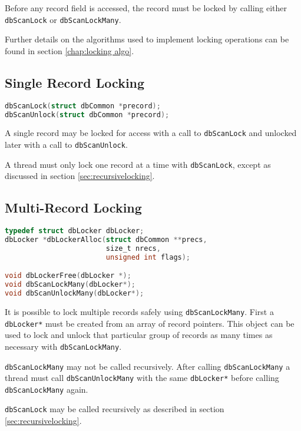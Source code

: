 Before any record field is accessed, the record must be locked by calling either \verb|dbScanLock| or \verb|dbScanLockMany|.

Further details on the algorithms used to implement locking operations can be found in section \ref{chap:locking algo}.

\subsection{Single Record Locking}

\begin{lstlisting}[language=C]
dbScanLock(struct dbCommon *precord);
dbScanUnlock(struct dbCommon *precord);
\end{lstlisting}

A single record may be locked for access with a call to \verb|dbScanLock| and unlocked later with a call to \verb|dbScanUnlock|.

A thread must only lock one record at a time with \verb|dbScanLock|, except as discussed in section \ref{sec:recursivelocking}.

\subsection{Multi-Record Locking}

\begin{lstlisting}[language=C]
typedef struct dbLocker dbLocker;
dbLocker *dbLockerAlloc(struct dbCommon **precs,
                        size_t nrecs,
                        unsigned int flags);

void dbLockerFree(dbLocker *);
void dbScanLockMany(dbLocker*);
void dbScanUnlockMany(dbLocker*);
\end{lstlisting}

It is possible to lock multiple records safely using \verb|dbScanLockMany|.
First a \verb|dbLocker*| must be created from an array of record pointers.
This object can be used to lock and unlock that particular group of records as many times as necessary with \verb|dbScanLockMany|.

\verb|dbScanLockMany| may not be called recursively.
After calling \verb|dbScanLockMany| a thread must call \verb|dbScanUnlockMany|
with the same \verb|dbLocker*| before calling \verb|dbScanLockMany| again.

\verb|dbScanLock| may be called recursively as described in section \ref{sec:recursivelocking}.

